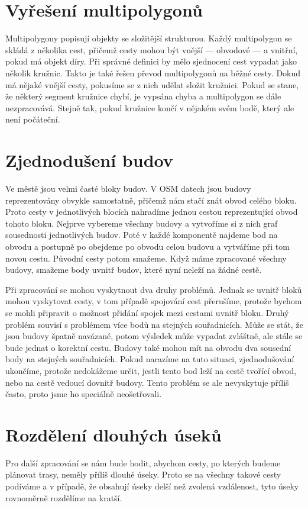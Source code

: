 \section{Vyřešení multipolygonů}
Multipolygony popisují objekty se složitější strukturou. Každý multipolygon se
skládá z několika cest, přičemž cesty mohou být vnější --- obvodové --- a
vnitřní, pokud má objekt díry. Při správné definici by mělo sjednocení cest
vypadat jako několik kružnic. Takto je také řešen převod multipolygonů na běžné
cesty. Dokud má nějaké vnější cesty, pokusíme se z nich udělat složit kružnici.
Pokud se stane, že některý segment kružnice chybí, je vypsána chyba a
multipolygon se dále nezpracovává. Stejně tak, pokud kružnice končí v nějakém
svém bodě, který ale není počáteční. 

\section{Zjednodušení budov}
Ve městě jsou velmi časté bloky budov. V OSM datech jsou budovy reprezentovány
obvykle samostatně, přičemž nám stačí znát obvod celého bloku. Proto cesty v
jednotlivých blocích nahradíme jednou cestou reprezentující obvod tohoto bloku.
Nejprve vybereme všechny budovy a vytvoříme si z nich graf sousednosti
jednotlivých budov. Poté v každé komponentě najdeme bod na obvodu a postupně
po obejdeme po obvodu celou budovu a vytváříme při tom novou cestu. Původní
cesty potom smažeme. Když máme zpracované všechny budovy, smažeme body uvnitř
budov, které nyní neleží na žádné cestě.

Při zpracování se mohou vyskytnout dva druhy problémů. Jednak se uvnitř bloků
mohou vyskytovat cesty, v tom případě spojování cest přerušíme, protože bychom
se mohli připravit o možnost přidání spojek mezi cestami uvnitř bloku. Druhý
problém souvisí s problémem více bodů na stejných souřadnicích. Může se stát, že
jsou budovy špatně navázané, potom výsledek může vypadat zvláštně, ale stále se
bude jednat o korektní cestu. Budovy také mohou mít na obvodu dva sousední body
na stejných souřadnicích. Pokud narazíme na tuto situaci, zjednodušování
ukončíme, protože nedokážeme určit, jestli tento bod leží na cestě tvořící
obvod, nebo na cestě vedoucí dovnitř budovy. Tento problém se ale nevyskytuje
příliš často, proto jsme ho speciálně neošetřovali.

\section{Rozdělení dlouhých úseků}
Pro další zpracování se nám bude hodit, abychom cesty, po kterých budeme
plánovat trasy, neměly příliš dlouhé úseky. Proto se na všechny takové cesty
podíváme a v případě, že obsahují úseky delší než zvolená vzdálenost, tyto úseky
rovnoměrně rozdělíme na kratší. 

